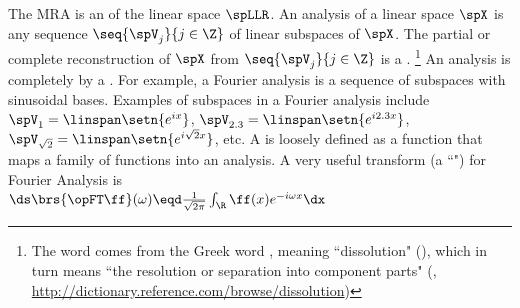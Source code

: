The MRA is an  of the linear space $\spLLR$.
An analysis of a linear space $\spX$ is any sequence $\seq{\spV_j}{j\in\Z}$ of linear subspaces of $\spX$.
        The partial or complete reconstruction of $\spX$ from $\seq{\spV_j}{j\in\Z}$ is a .%
        \footnote{%
          The word  comes from the Greek word
          {},
          meaning ``dissolution" (),
          which in turn means
          ``the resolution or separation into component parts"
          (, \scs\url{http://dictionary.reference.com/browse/dissolution})
          }
  An analysis is completely  by a .
  For example, a Fourier analysis is a sequence of subspaces with sinusoidal bases.
  Examples of subspaces in a Fourier analysis include $\spV_1=\linspan\setn{e^{ix}}$,
  $\spV_{2.3}=\linspan\setn{e^{i2.3x}}$, $\spV_{\sqrt{2}}=\linspan\setn{e^{i\sqrt{2}x}}$, etc.
  A  is loosely defined as a function that maps a family of functions
  into an analysis.
  A very useful transform (a ``") for Fourier Analysis is 
  \\\indentx$\ds\brs{\opFT\ff}(\omega) \eqd \frac{1}{\sqrt{2\pi}} \int_\R \ff(x) e^{-i\omega x} \dx$

